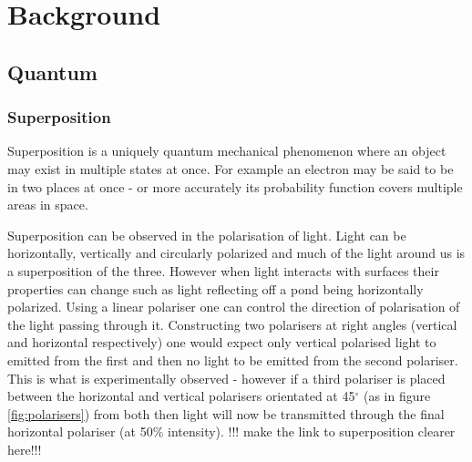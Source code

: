 \section{Background}

\subsection{Quantum}
\subsubsection{Superposition}
Superposition is a uniquely quantum mechanical phenomenon where an object may exist in multiple states at once. 
For example an electron may be said to be in two places at once - or more accurately its probability function covers multiple areas in space. \cite{noauthor_whatCal_nodate}

Superposition can be observed in the polarisation of light. 
Light can be horizontally, vertically and circularly polarized and much of the light around us is a superposition of the three.
However when light interacts with surfaces their properties can change such as light reflecting off a pond being horizontally polarized. 
Using a linear polariser one can control the direction of polarisation of the light passing through it.
Constructing two polarisers at right angles (vertical and horizontal respectively) one would expect only vertical polarised light to emitted from the first and then no light to be emitted from the second polariser. 
This is what is experimentally observed - however if a third polariser is placed between the horizontal and vertical polarisers orientated at 45$^\circ$ (as in figure \ref{fig:polarisers}) from both then light will now be transmitted through the final horizontal polariser (at 50$\%$ intensity). \cite{noauthor_whatCal_nodate}
!!! make the link to superposition clearer here!!!

